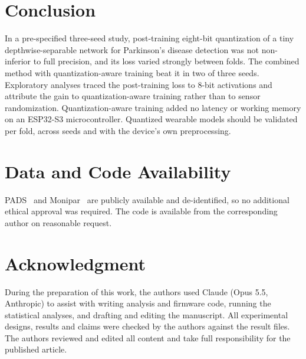\documentclass[journal,twoside,web]{ieeecolor}
\begin{document}
\section{Conclusion}
In a pre-specified three-seed study, post-training eight-bit quantization of a tiny depthwise-separable network for Parkinson's disease detection was not non-inferior to full precision, and its loss varied strongly between folds. The combined method with quantization-aware training beat it in two of three seeds. Exploratory analyses traced the post-training loss to 8-bit activations and attribute the gain to quantization-aware training rather than to sensor randomization. Quantization-aware training added no latency or working memory on an ESP32-S3 microcontroller. Quantized wearable models should be validated per fold, across seeds and with the device's own preprocessing.

\section*{Data and Code Availability}
PADS~\cite{PADSdata} and Monipar~\cite{MoniparData} are publicly available and de-identified, so no additional ethical approval was required. The code is available from the corresponding author on reasonable request.

\section*{Acknowledgment}
During the preparation of this work, the authors used Claude (Opus 5.5, Anthropic) to assist with writing analysis and firmware code, running the statistical analyses, and drafting and editing the manuscript. All experimental designs, results and claims were checked by the authors against the result files. The authors reviewed and edited all content and take full responsibility for the published article.



\end{document}
